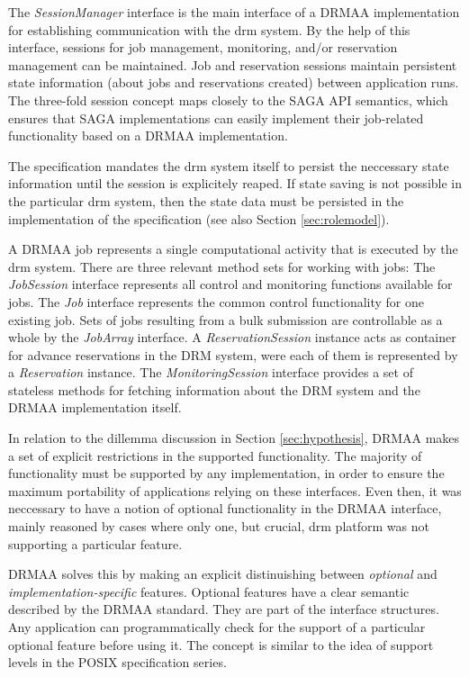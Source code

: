 \documentclass[twocolumn]{svjour3}       %
\begin{document}
The \emph{SessionManager} interface is the main interface of a DRMAA implementation for establishing communication with the \gls{drm} system. By the help of this interface, sessions for job management, monitoring, and/or reservation management can be maintained. Job and reservation sessions maintain persistent state information (about jobs and reservations created) between application runs. The three-fold session concept maps closely to the SAGA API semantics, which ensures that SAGA implementations can easily implement their job-related functionality based on a DRMAA implementation.

The specification mandates the \gls{drm} system itself to persist the neccessary state information until the session is explicitely reaped. If state saving is not possible in the particular \gls{drm} system, then the state data must be persisted in the implementation of the specification (see also Section \ref{sec:rolemodel}). 

A DRMAA job represents a single computational activity that is executed by the \gls{drm} system. There are three relevant method sets for working with jobs: The \emph{JobSession} interface represents all control and monitoring functions available for jobs. The \emph{Job} interface represents the common control functionality for one existing job. Sets of jobs resulting from a bulk submission are controllable as a whole by the \emph{JobArray} interface. A \emph{ReservationSession} instance acts as container for advance reservations in the DRM system, were each of them is represented by a \emph{Reservation} instance. The \emph{MonitoringSession} interface provides a set of stateless methods for fetching information about the DRM system and the DRMAA implementation itself.

In relation to the dillemma discussion in Section \ref{sec:hypothesis}, DRMAA makes a set of explicit restrictions in the supported functionality. The majority of functionality must be supported by any implementation, in order to ensure the maximum portability of applications relying on these interfaces. Even then, it was neccessary to have a notion of optional functionality in the DRMAA interface, mainly reasoned by cases where only one, but crucial, \gls{drm} platform was not supporting a particular feature. 

DRMAA solves this by making an explicit distinuishing between \emph{optional} and \emph{implementation-specific} features. Optional features have a clear semantic described by the DRMAA standard. They are part of the interface structures. Any application can programmatically check for the support of a particular optional feature before using it. The concept is similar to the idea of support levels in the POSIX specification series.
\end{document}

